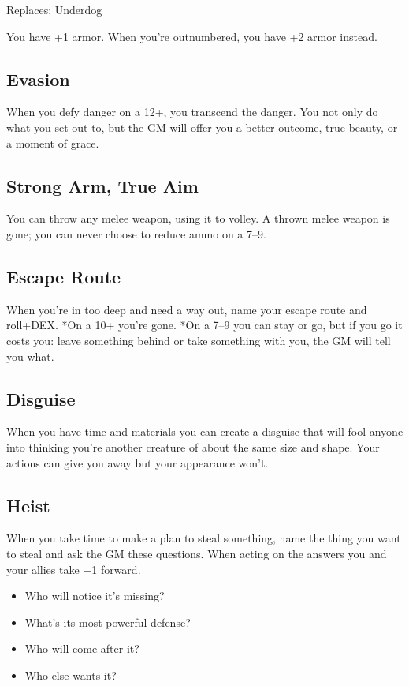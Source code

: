  Replaces: Underdog


 You have +1 armor. When you're outnumbered, you have +2 armor instead.
\subsection{Evasion}


 When you defy danger on a 12+, you transcend the danger. You not only do what you set out to, but the GM will offer you a better outcome, true beauty, or a moment of grace.
\subsection{Strong Arm, True Aim}


 You can throw any melee weapon, using it to volley. A thrown melee weapon is gone; you can never choose to reduce ammo on a 7--9.
\subsection{Escape Route}


 When you're in too deep and need a way out, name your escape route and roll+DEX. *On a 10+ you're gone. *On a 7--9 you can stay or go, but if you go it costs you: leave something behind or take something with you, the GM will tell you what.
\subsection{Disguise}


 When you have time and materials you can create a disguise that will fool anyone into thinking you're another creature of about the same size and shape. Your actions can give you away but your appearance won't.
\subsection{Heist}


 When you take time to make a plan to steal something, name the thing you want to steal and ask the GM these questions. When acting on the answers you and your allies take +1 forward.
\begin{itemize}
\item Who will notice it's missing?
\item What's its most powerful defense?
\item Who will come after it?
\item Who else wants it?

\end{itemize}



